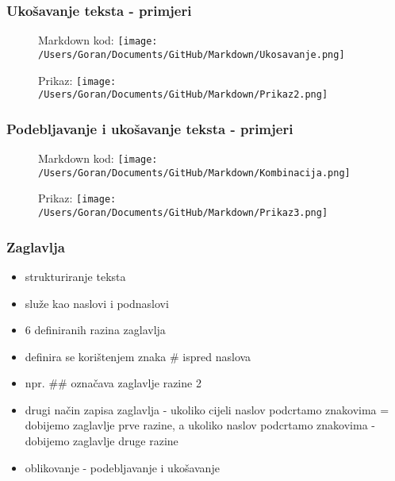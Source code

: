 \documentclass{beamer}
\begin{document}
\newpage

\begin{frame}
\frametitle{Ukošavanje teksta - primjeri}

\begin{figure}
{Markdown kod:}
\texttt{[image: /Users/Goran/Documents/GitHub/Markdown/Ukosavanje.png]}
\end{figure}

\begin{figure}
{Prikaz:}
\texttt{[image: /Users/Goran/Documents/GitHub/Markdown/Prikaz2.png]}
\end{figure}

\end{frame}


\newpage

\begin{frame}
\frametitle{Podebljavanje i ukošavanje teksta - primjeri}

\begin{figure}
{Markdown kod:} 
\texttt{[image: /Users/Goran/Documents/GitHub/Markdown/Kombinacija.png]}
\end{figure}

\begin{figure}
{Prikaz:}
\texttt{[image: /Users/Goran/Documents/GitHub/Markdown/Prikaz3.png]}
\end{figure}

\end{frame}

\newpage

\begin{frame}
\frametitle{Zaglavlja}
\begin{itemize}
\item strukturiranje teksta
\item služe kao naslovi i podnaslovi
\item 6 definiranih razina zaglavlja
\item definira se korištenjem znaka \# ispred naslova
\item npr. \#\# označava zaglavlje razine 2
\item drugi način zapisa zaglavlja - ukoliko cijeli naslov podcrtamo znakovima = dobijemo zaglavlje prve razine, a ukoliko naslov podcrtamo znakovima - dobijemo zaglavlje druge razine 
\item oblikovanje - podebljavanje i ukošavanje
\end{itemize}
\end{frame}
\end{document}
